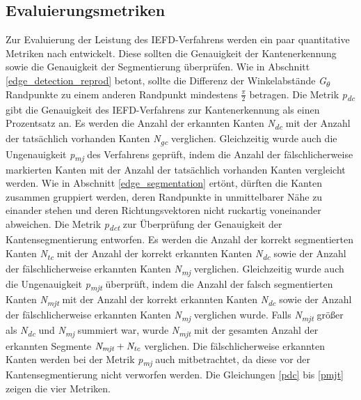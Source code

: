 \subsection{Evaluierungsmetriken} \label{evaluations_metrics}
Zur Evaluierung der Leistung des IEFD-Verfahrens werden ein paar quantitative Metriken nach \textcite[10]{ni_edge_2016} entwickelt. Diese sollten die Genauigkeit der Kantenerkennung sowie die Genauigkeit der Segmentierung überprüfen. Wie in Abschnitt \ref{edge_detection_reprod} betont, sollte die Differenz der Winkelabstände \textit{G\textsubscript{$\theta$}} Randpunkte zu einem anderen Randpunkt mindestens $\frac{\pi}{2}$ betragen. Die Metrik \textit{p\textsubscript{dc}} gibt die Genauigkeit des IEFD-Verfahrens zur Kantenerkennung als einen Prozentsatz an. Es werden die Anzahl der erkannten Kanten \textit{N\textsubscript{dc}} mit der Anzahl der tatsächlich vorhanden Kanten \textit{N\textsubscript{gc}} verglichen. Gleichzeitig wurde auch die Ungenauigkeit \textit{p\textsubscript{mj}} des Verfahrens geprüft, indem die Anzahl der fälschlicherweise markierten Kanten mit der Anzahl der tatsächlich vorhanden Kanten vergleicht werden. Wie in Abschnitt \ref{edge_segmentation} ertönt, dürften die Kanten zusammen gruppiert werden, deren Randpunkte in unmittelbarer Nähe zu einander stehen und deren Richtungsvektoren nicht ruckartig voneinander abweichen. Die Metrik \textit{p\textsubscript{dct}} zur Überprüfung der Genauigkeit der Kantensegmentierung entworfen. Es werden die Anzahl der korrekt segmentierten Kanten \textit{N\textsubscript{tc}} mit der Anzahl der korrekt erkannten Kanten \textit{N\textsubscript{dc}} sowie der Anzahl der fälschlicherweise erkannten Kanten \textit{N\textsubscript{mj}} verglichen. Gleichzeitig wurde auch die Ungenauigkeit \textit{p\textsubscript{mjt}} überprüft, indem die Anzahl der falsch segmentierten Kanten \textit{N\textsubscript{mjt}} mit der Anzahl der korrekt erkannten Kanten \textit{N\textsubscript{dc}} sowie der Anzahl der fälschlicherweise erkannten Kanten \textit{N\textsubscript{mj}} verglichen wurde. Falls \textit{N\textsubscript{mjt}} größer als \textit{N\textsubscript{dc}} und \textit{N\textsubscript{mj}} summiert war, wurde \textit{N\textsubscript{mjt}} mit der gesamten Anzahl der erkannten Segmente $\textit{N\textsubscript{mjt}} + \textit{N\textsubscript{tc}}$ verglichen. Die fälschlicherweise erkannten Kanten werden bei der Metrik \textit{p\textsubscript{mj}} auch mitbetrachtet, da diese vor der Kantensegmentierung nicht verworfen werden. Die Gleichungen \ref{pdc} bis \ref{pmjt} zeigen die vier Metriken.


